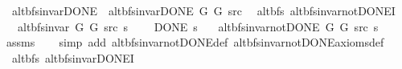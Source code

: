 \begin{isabellebody}
\ \ {\isachardoublequoteopen}alt{\isacharunderscore}{\kern0pt}bfs{\isacharunderscore}{\kern0pt}invar{\isacharunderscore}{\kern0pt}DONE{\isacharprime}{\kern0pt}{\isacharprime}{\kern0pt}\ {\isasymequiv}\ alt{\isacharunderscore}{\kern0pt}bfs{\isacharunderscore}{\kern0pt}invar{\isacharunderscore}{\kern0pt}DONE{\isacharprime}{\kern0pt}\ G{}\ G{}\ src{\isachardoublequoteclose}%
\isadelimdocument
%
\endisadelimdocument
%
\isatagdocument
%
\isamarkuptrue%
%
\isamarkuptrue%
%
\endisatagdocument
{\isafolddocument}%
%
\isadelimdocument
%
\endisadelimdocument
{}\isamarkupfalse%
\ {\isacharparenleft}{\kern0pt}\ alt{\isacharunderscore}{\kern0pt}bfs{\isacharparenright}{\kern0pt}\ alt{\isacharunderscore}{\kern0pt}bfs{\isacharunderscore}{\kern0pt}invar{\isacharunderscore}{\kern0pt}not{\isacharunderscore}{\kern0pt}DONE{\isacharprime}{\kern0pt}I{\isacharcolon}{\kern0pt}\isanewline
\ \ \ {\isachardoublequoteopen}alt{\isacharunderscore}{\kern0pt}bfs{\isacharunderscore}{\kern0pt}invar{\isacharprime}{\kern0pt}\ G{}\ G{}\ src\ s{\isachardoublequoteclose}\isanewline
\ \ \ {\isachardoublequoteopen}{\isasymnot}\ DONE\ s{\isachardoublequoteclose}\isanewline
\ \ \ {\isachardoublequoteopen}alt{\isacharunderscore}{\kern0pt}bfs{\isacharunderscore}{\kern0pt}invar{\isacharunderscore}{\kern0pt}not{\isacharunderscore}{\kern0pt}DONE{\isacharprime}{\kern0pt}\ G{}\ G{}\ src\ s{\isachardoublequoteclose}\isanewline
%
\isadelimproof
\ \ %
\endisadelimproof
%
\isatagproof
{}\isamarkupfalse%
\ assms\isanewline
\ \ \isamarkupfalse%
\ {\isacharparenleft}{\kern0pt}simp\ add{\isacharcolon}{\kern0pt}\ alt{\isacharunderscore}{\kern0pt}bfs{\isacharunderscore}{\kern0pt}invar{\isacharunderscore}{\kern0pt}not{\isacharunderscore}{\kern0pt}DONE{\isacharunderscore}{\kern0pt}def\ alt{\isacharunderscore}{\kern0pt}bfs{\isacharunderscore}{\kern0pt}invar{\isacharunderscore}{\kern0pt}not{\isacharunderscore}{\kern0pt}DONE{\isacharunderscore}{\kern0pt}axioms{\isacharunderscore}{\kern0pt}def{\isacharparenright}{\kern0pt}%
\endisatagproof
{\isafoldproof}%
%
\isadelimproof
\isanewline
%
\endisadelimproof
\isanewline
{}\isamarkupfalse%
\ {\isacharparenleft}{\kern0pt}\ alt{\isacharunderscore}{\kern0pt}bfs{\isacharparenright}{\kern0pt}\ alt{\isacharunderscore}{\kern0pt}bfs{\isacharunderscore}{\kern0pt}invar{\isacharunderscore}{\kern0pt}DONE{\isacharprime}{\kern0pt}I{\isacharcolon}{\kern0pt}\isanewline

\end{isabellebody}

